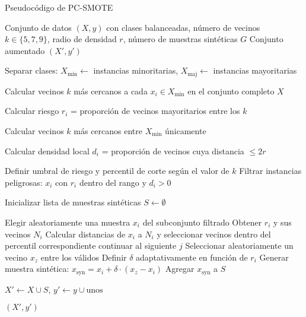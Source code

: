 \begin{algorithm}[H]
\caption{Pseudocódigo de PC-SMOTE}
\begin{algorithmic}[1]
\REQUIRE Conjunto de datos $(X, y)$ con clases balanceadas, número de vecinos $k \in \{5, 7, 9\}$, radio de densidad $r$, número de muestras sintéticas $G$
\ENSURE Conjunto aumentado $(X', y')$

\STATE Separar clases: $X_{\text{min}} \gets$ instancias minoritarias, $X_{\text{maj}} \gets$ instancias mayoritarias

\STATE Calcular vecinos $k$ más cercanos a cada $x_i \in X_{\text{min}}$ en el conjunto completo $X$

    \STATE Calcular riesgo $r_i$ = proporción de vecinos mayoritarios entre los $k$
\ENDFOR

\STATE Calcular vecinos $k$ más cercanos entre $X_{\text{min}}$ únicamente

    \STATE Calcular densidad local $d_i$ = proporción de vecinos cuya distancia $\leq 2r$
\ENDFOR

\STATE Definir umbral de riesgo y percentil de corte según el valor de $k$
\STATE Filtrar instancias peligrosas: $x_i$ con $r_i$ dentro del rango y $d_i > 0$

\STATE Inicializar lista de muestras sintéticas $S \gets \emptyset$

    \STATE Elegir aleatoriamente una muestra $x_i$ del subconjunto filtrado
    \STATE Obtener $r_i$ y sus vecinos $N_i$
    \STATE Calcular distancias de $x_i$ a $N_i$ y seleccionar vecinos dentro del percentil correspondiente
        \STATE continuar al siguiente $j$
    \ENDIF
    \STATE Seleccionar aleatoriamente un vecino $x_z$ entre los válidos
    \STATE Definir $\delta$ adaptativamente en función de $r_i$
    \STATE Generar muestra sintética: $x_{\text{syn}} = x_i + \delta \cdot (x_z - x_i)$
    \STATE Agregar $x_{\text{syn}}$ a $S$
\ENDFOR

\STATE $X' \gets X \cup S$, $y' \gets y \cup \text{unos}$

\RETURN $(X', y')$
\end{algorithmic}
\end{algorithm}
